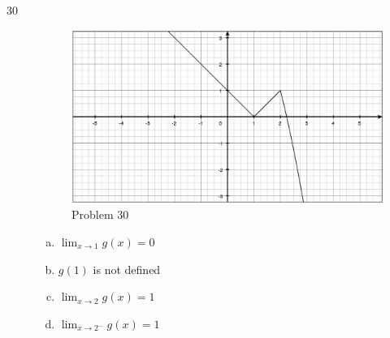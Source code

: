 \documentclass{exam}
\begin{document}
\begin{description}
\item[30]
\begin{figure}[H]
  \centering
  \includegraphics[scale=.3]{problem_30.eps}
  \caption*{Problem 30}
\end{figure}

\begin{enumerate}[(a)]

\item $\lim_{x \to 1} g(x) = 0$
\item $g(1)$ is not defined

\item $\lim_{x \to 2} g(x) = 1$
\item $\lim_{x \to 2^-} g(x) = 1$

\end{enumerate}

\end{description}
\end{document}
